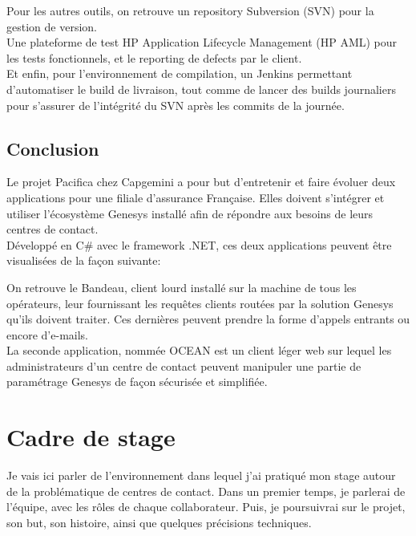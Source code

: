 \documentclass{rapport}
\begin{document}
Pour les autres outils, on retrouve un repository Subversion (SVN) pour la gestion de version.\\
Une plateforme de test HP Application Lifecycle Management (HP AML) pour les tests fonctionnels, et le reporting de defects par le client.\\
Et enfin, pour l'environnement de compilation, un Jenkins permettant d'automatiser le build de livraison, tout comme de lancer des builds journaliers pour s'assurer de l'intégrité du SVN après les commits de la journée.

\subsection*{Conclusion}

Le projet Pacifica chez Capgemini a pour but d'entretenir et faire évoluer deux applications pour une filiale d'assurance Française. Elles doivent s'intégrer et utiliser l'écosystème Genesys installé  afin de répondre aux besoins de leurs centres de contact.\\

Développé en C\# avec le framework .NET, ces deux applications peuvent être visualisées de la façon suivante:


On retrouve le Bandeau, client lourd installé sur la machine de tous les opérateurs, leur fournissant les requêtes clients routées par la solution Genesys qu'ils doivent traiter. Ces dernières peuvent prendre la forme d'appels entrants ou encore d'e-mails.\\

La seconde application, nommée OCEAN est un client léger web sur lequel les administrateurs d'un centre de contact peuvent manipuler une partie de paramétrage Genesys de façon sécurisée et simplifiée.

\newpage

\section{Cadre de stage}

Je vais ici parler de l'environnement dans lequel j'ai pratiqué mon stage autour de la problématique de centres de contact.
Dans un premier temps, je parlerai de l'équipe, avec les rôles de chaque collaborateur. Puis, je poursuivrai sur le projet, son but, son histoire, ainsi que quelques précisions techniques.
\end{document}
